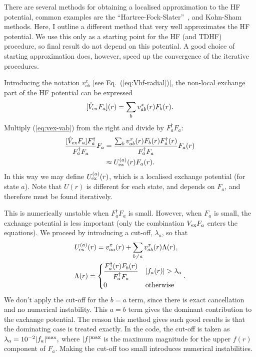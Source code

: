 \documentclass[10pt,twocolumn,a4paper]{article}%
\newcommand{\be}{\begin{equation}}
\newcommand{\ee}{\end{equation}}
\begin{document}
There are several methods for obtaining a localised approximation to the HF potential, common  examples are the ``Hartree-Fock-Slater''~\cite{Slater1951}, and Kohn-Sham methods.
%
Here, I outline a different method that very well approximates the HF potential. 
We use this only as a starting point for the HF (and TDHF) procedure, so final result do not depend on this potential. 
A good choice of starting approximation does, however, speed up the convergence of the iterative procedures.

Introducing the notation $v^x_{ab}$ [see Eq.~(\ref{eq:Vhf-radial})], the non-local exchange part of the HF potential can be expressed
\be\label{eq:vex-vab}
 [\hat V_{\rm ex}F_a](r) = \sum_b v^x_{ab}(r) F_b(r).
\ee
Multiply (\ref{eq:vex-vab}) from the right and divide  by $ F_a^\dag F_a$:
\begin{align}
 \frac{[\hat V_{\rm ex}F_a] F_a^\dag }{F_a^\dag F_a} F_a
&= \frac{\sum_b v^x_{ab}(r) F_b(r)F_a^\dag(r) }{F_a^\dag F_a} F_a(r)\\
&\approx U^{(a)}_{\rm ex}(r)F_a(r).
\end{align}
In this way we may define $U^{(a)}_{\rm ex}(r)$, which is a localised exchange potential (for state $a$).
Note that $U(r)$ is different for each state, and depends on $F_a$, and therefore must be found iteratively.

This is numerically unstable when $F_a^\dag F_a$ is small.
However, when $F_a$ is small, the exchange potential is less important (only the combination $V_{\rm ex}F_a$ enters the equations).
We proceed by introducing a cut-off, $\lambda_a$, so that
\begin{align}
& U^{(a)}_{\rm ex}(r) =  
v^x_{aa}(r) + \sum_{b\neq a} v^x_{ab}(r) \Lambda(r),
\\
&\Lambda(r) = 
\begin{cases}\dfrac{F_a^\dag(r) F_b(r)}{F_a^\dag F_a} & |f_a(r)|>\lambda_a\\
0&\mathrm{otherwise}
\end{cases}.
\end{align}
%
We don't apply the cut-off for the $b=a$ term, since there is exact cancellation and no numerical instability.
This $a=b$ term gives the dominant contribution to the exchange potential. 
The reason this method gives such good results is that the dominating case is treated exactly.
%
In the code, the cut-off is taken as
$
\lambda_{a} = 10^{-2} |f_a|^{\rm max},
$
where  $|f|^{\rm max}$ is the maximum magnitude for the upper $f(r)$ component of $F_a$.
Making the cut-off too small introduces numerical instabilities.
%
\end{document}
